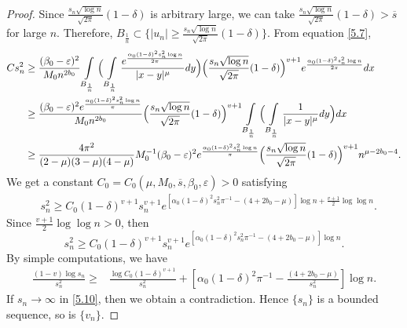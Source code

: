 \documentclass[10pt,a4paper]{amsart}
\begin{document}
\begin{proof}
		Since $\frac{s_n \sqrt{\log{n}}}{\sqrt{2\pi}}( 1- \delta)$ is arbitrary large, we can take $\frac{s_n \sqrt{\log{n}}}{\sqrt{2\pi}}( 1- \delta) > \overline{s}$ for large $n$. Therefore, $B_{\frac{1}{n}} \subset \Big\{|u_n| \geq \frac{s_n \sqrt{\log{n}}}{\sqrt{2\pi}} ( 1- \delta) \Big\}$.
		From equation \eqref{5.7},
		\begin{align}
			Cs_n^2 &\geq \frac{ (\beta_0-\varepsilon)^2}{M_0 n^{2b_0}}\int\limits\limits_{B_{\frac{1}{n}}} \Big( \int\limits\limits_{B_\frac{1}{n}} \frac{e^{\frac{\alpha_0(1-\delta)^2 s_n^2 \log{n}}{2\pi}}}{|x-y|^\mu} dy\Big) \Big( \frac{s_n \sqrt{\log{n}}}{\sqrt{2\pi}} (1-\delta)\Big)^{v+1} e^{\frac{\alpha_0(1-\delta)^2 s_n^2 \log{n}}{2\pi}}dx \nonumber\\
			&\geq \frac{(\beta_0-\varepsilon)^2 e^{\frac{\alpha_0(1-\delta)^2 s_n^2 \log{n}}{\pi}}}{M_0 n^{2b_0}}\Big( \frac{s_n \sqrt{\log{n}}}{\sqrt{2\pi}} (1-\delta)\Big)^{v+1} \int\limits\limits_{B_{\frac{1}{n}}} \Big( \int\limits\limits_{B_\frac{1}{n}} \frac{1}{|x-y|^\mu} dy\Big) dx\nonumber  \\
			&\geq \frac{4\pi^2}{(2-\mu)(3-\mu)(4-\mu)} M_0^{-1} (\beta_0-\varepsilon)^2 e^{\frac{\alpha_0(1-\delta)^2 s_n^2 \log{n}}{\pi}}	\Big( \frac{s_n \sqrt{\log{n}}}{\sqrt{2\pi}} (1-\delta)\Big)^{v+1} n^{\mu-2b_0-4}. \nonumber
		\end{align}
		We get a constant $C_0= C_0(\mu, M_0, \overline{s}, \beta_0, \varepsilon)>0$ satisfying
		\begin{align}
			& s_n^2\geq C_0 (1-\delta)^{v+1} s_n^{v+1} e^{[\alpha_0 (1-\delta)^2 s_n^2 \pi^{-1}-(4+2b_0-\mu)]\log{n} + \frac{v+1}{2} \log{\log{n}}}. \label{5.8}
		\end{align}
		Since $ \frac{v+1}{2} \log{\log{n}} >0$, then
		\begin{equation}
			\label{5.9}
			s_n^2 \geq C_0 (1-\delta)^{v+1} s_n^{v+1} e^{[\alpha_0 (1-\delta)^2 s_n^2 \pi^{-1}-(4+2b_0-\mu)]\log{n}}. 
		\end{equation}
		By simple computations, we have 
		\begin{align}
			\label{5.10}
			\frac{(1-v)\log{s_n}}{s_n^2} \geq & \frac{\log{C_0(1-\delta)^{v+1}}}{s_n^2} + \left[\alpha_0 (1-\delta)^2 \pi^{-1}-\frac{(4+2b_0-\mu)}{s_n^2} \right]\log{n}.
		\end{align}
		If $s_n \rightarrow \infty$ in \eqref{5.10}, then we obtain a contradiction. Hence $\{s_n\}$ is a bounded sequence, so is $\{v_n\}$.
		

\end{proof}
\end{document}
